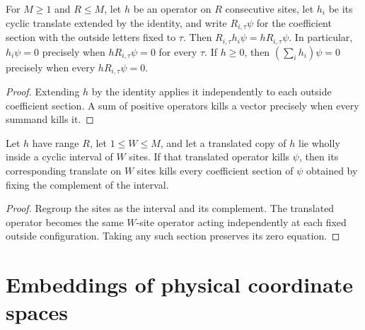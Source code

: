 \begin{lemma}
    \label{lem:periodic_interaction_sections}
    \leanok
    For $M\ge1$ and $R\le M$, let $h$ be an operator on $R$ consecutive sites,
    let $h_i$ be its cyclic translate extended by the identity, and write
    $R_{i,\tau}\psi$ for the coefficient section with the outside letters
    fixed to $\tau$. Then $R_{i,\tau}h_i\psi=hR_{i,\tau}\psi$.
    In particular, $h_i\psi=0$ precisely when $hR_{i,\tau}\psi=0$ for every
    $\tau$. If $h\ge0$, then
    $(\sum_i h_i)\psi=0$ precisely when every $hR_{i,\tau}\psi=0$.
\end{lemma}
\begin{proof}
    \leanok
    Extending $h$ by the identity applies it independently to each outside
    coefficient section. A sum of positive operators kills a vector precisely
    when every summand kills it.
\end{proof}

\begin{lemma}
    \label{lem:periodic_interaction_interval_section}
    \leanok
    Let $h$ have range $R$, let $1\le W\le M$, and let a translated copy of
    $h$ lie wholly inside a cyclic interval of $W$ sites. If that translated
    operator kills $\psi$, then its corresponding translate on $W$ sites
    kills every coefficient section of $\psi$ obtained by fixing the
    complement of the interval.
\end{lemma}
\begin{proof}
    \leanok
    Regroup the sites as the interval and its complement. The translated
    operator becomes the same $W$-site operator acting independently at
    each fixed outside configuration. Taking any such section preserves
    its zero equation.
\end{proof}

\section{Embeddings of physical coordinate spaces}

